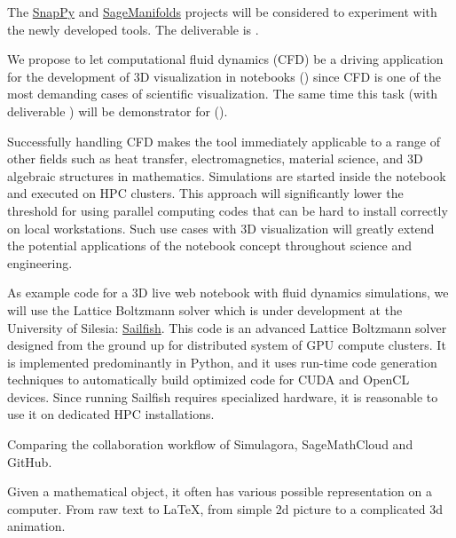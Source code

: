 \begin{workpackage}
\begin{tasklist}
\begin{task}[title=Visualization system for 3D data in web-notebook
,id=vis3d,lead=SR, partners={US,PS,USO}, PM=12, wphases=0-24]
The \href{http://www.math.uic.edu/t3m/SnapPy/}{SnapPy}
and \href{http://sagemanifolds.obspm.fr/}{SageManifolds} projects will be
considered to experiment with the newly developed tools.
The deliverable is .
\end{task}


\begin{task}[title=Visualization of 3D fluid dynamics data in web-notebook
,id=cfd-vis,lead=SR, partners={US,PS,USO},PM=5,wphases=12-36]

We propose to let computational fluid dynamics (CFD) be a driving
application for the development of 3D visualization in \Jupyter
notebooks () since CFD is one of the most demanding
cases of scientific visualization. The same time this task
(with deliverable ) will be
demonstrator for ().

Successfully handling CFD makes the tool immediately applicable to a
range of other fields such as heat transfer, electromagnetics,
material science, and 3D algebraic structures in
mathematics. Simulations are started inside the notebook and executed
on HPC clusters. This approach will significantly lower the threshold
for using parallel computing codes that can be hard to install
correctly on local workstations. Such use cases with 3D visualization
will greatly extend the potential applications of the \Jupyter
notebook concept throughout science and engineering.

As example code for a 3D live web notebook with fluid dynamics
simulations, we will use the Lattice Boltzmann solver which is under
development at the University of Silesia:
\href{http://sailfish.us.edu.pl/}{Sailfish}.  This code is an advanced
Lattice Boltzmann solver designed from the ground up for distributed
system of GPU compute clusters. It is implemented predominantly in
Python, and it uses run-time code generation techniques to
automatically build optimized code for CUDA and OpenCL devices. Since
running Sailfish requires specialized hardware, it is reasonable to
use it on dedicated HPC installations.
\end{task}

\begin{task}[id=simulagora,title=Simulagora collaboration,lead=LL,PM=2,wphases=0-12]
  Comparing the collaboration workflow of Simulagora, SageMathCloud and GitHub.
\end{task}

\begin{task}[lead=UB,title=Common option system for various displays in Sage,id=Sage-display,PM=12,partners={UB},wphases=0-24]
  Given a mathematical object, it often has various possible representation on a
  computer. From raw text to \LaTeX, from simple 2d picture to
  a complicated 3d animation.


\end{task}
\end{tasklist}
\end{workpackage}
